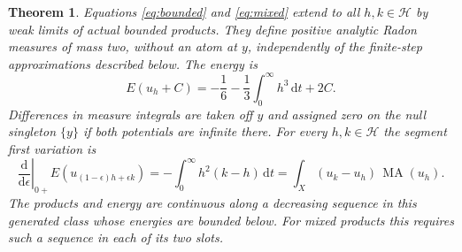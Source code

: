 \documentclass[11pt]{article}
\newtheorem{theorem}{Theorem}
\newcommand{\MA}{\operatorname{MA}}
\begin{document}
\begin{theorem}\label{thm:extension}
Equations \eqref{eq:bounded} and \eqref{eq:mixed} extend to all
$h,k\in\mathcal H$ by weak limits of actual bounded products. They define
positive analytic Radon measures of mass two, without an atom at $y$,
independently of the finite-step approximations described below. The
energy is
\[
 E(u_h+C)=-\frac16-\frac13\int_0^\infty h^3\,\mathrm dt+2C.
\]
Differences in measure integrals are taken off $y$ and assigned zero on
the null singleton $\{y\}$ if both potentials are infinite there.
For every $h,k\in\mathcal H$ the segment first variation is
\[
 \left.\frac{\mathrm d}{\mathrm d\epsilon}\right|_{0+}
 E(u_{(1-\epsilon)h+\epsilon k})
       =-\int_0^\infty h^2(k-h)\,\mathrm dt
       =\int_X(u_k-u_h)\,\MA(u_h).
\]
The products and energy are continuous along a decreasing sequence in
this generated class whose energies are bounded below. For mixed
products this requires such a sequence in each of its two slots.
\end{theorem}
\end{document}
